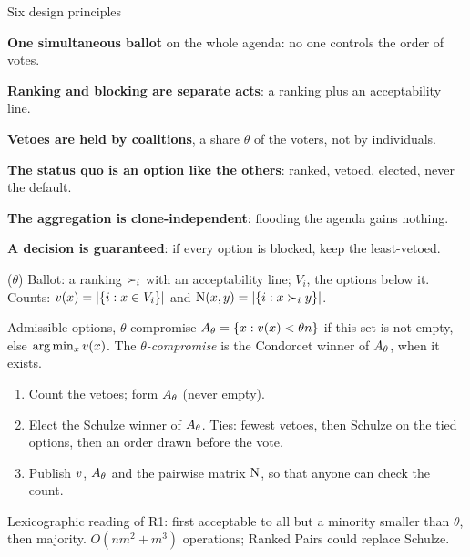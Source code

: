 \documentclass[10pt,aspectratio=169]{beamer}
\begin{document}
\begin{frame}{Six design principles}
  \begin{description}[P1]
    \item[P1] \textbf{One simultaneous ballot} on the whole agenda: no one controls the order of votes.
    \item[P2] \textbf{Ranking and blocking are separate acts}: a ranking plus an acceptability line.
    \item[P3] \textbf{Vetoes are held by coalitions}, a share $\theta$ of the voters, not by individuals.
    \item[P4] \textbf{The status quo is an option like the others}: ranked, vetoed, elected, never the
      default.
    \item[P5] \textbf{The aggregation is clone-independent}: flooding the agenda gains nothing.
    \item[P6] \textbf{A decision is guaranteed}: if every option is blocked, keep the least-vetoed.
  \end{description}
  \medskip
\end{frame}

\begin{frame}{\QVC($\theta$)}
  Ballot: a ranking $\succ_i$ with an acceptability line; $V_i$, the options below it. Counts:
  $v(x) = |\{i : x \in V_i\}|$ and $\operatorname{N}(x,y) = |\{i : x \succ_i y\}|$.
  \begin{block}{Admissible options, $\theta$-compromise}
    $A_\theta = \{x : v(x) < \theta n\}$ if this set is not empty, else $\arg\min_x v(x)$.
    The \emph{$\theta$-compromise} is the Condorcet winner of $A_\theta$, when it exists.
  \end{block}
  \begin{enumerate}
    \item Count the vetoes; form $A_\theta$ (never empty).
    \item Elect the Schulze winner of $A_\theta$. Ties: fewest vetoes, then Schulze on the tied options, then an
      order drawn before the vote.
    \item Publish $v$, $A_\theta$ and the pairwise matrix $\operatorname{N}$, so that anyone can check the count.
  \end{enumerate}
  \medskip
  Lexicographic reading of R1: first acceptable to all but a minority smaller than $\theta$, then majority.
  $O(nm^2 + m^3)$ operations; Ranked Pairs could replace Schulze.
\end{frame}
\end{document}
